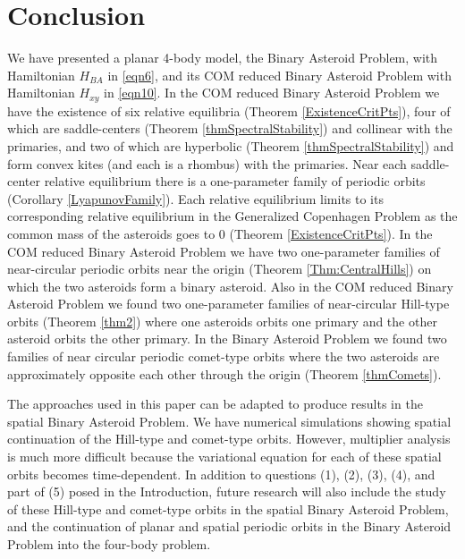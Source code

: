 \documentclass[12pt]{article}
\begin{document}

\section{Conclusion}\label{sec13}
We have presented a planar 4-body model, the Binary Asteroid Problem, with Hamiltonian $H_{BA}$ in \eqref{eqn6}, and its COM reduced Binary Asteroid Problem with Hamiltonian $H_{xy}$ in \eqref{eqn10}. In the COM reduced Binary Asteroid Problem we have the existence of six relative equilibria (Theorem \ref{ExistenceCritPts}), four of which are saddle-centers (Theorem \ref{thmSpectralStability}) and collinear with the primaries, and two of which are hyperbolic (Theorem \ref{thmSpectralStability}) and form convex kites (and each is a rhombus) with the primaries. Near each saddle-center relative equilibrium there is a one-parameter family of periodic orbits (Corollary \ref{LyapunovFamily}). Each relative equilibrium limits to its corresponding relative equilibrium in the Generalized Copenhagen Problem as the common mass of the asteroids goes to $0$ (Theorem \ref{ExistenceCritPts}). In the COM reduced Binary Asteroid Problem we have two one-parameter families of near-circular periodic orbits near the origin (Theorem \ref{Thm:CentralHills}) on which the two asteroids form a binary asteroid. Also in the COM reduced Binary Asteroid Problem we found two one-parameter families of near-circular Hill-type orbits (Theorem \ref{thm2}) where one asteroids orbits one primary and the other asteroid orbits the other primary. In the Binary Asteroid Problem we found two families of near circular periodic comet-type orbits where the two asteroids are approximately opposite each other through the origin (Theorem \ref{thmComets}).

The approaches used in this paper can be adapted to produce results in the spatial Binary Asteroid Problem. We have numerical simulations showing spatial continuation of the Hill-type and comet-type orbits. However, multiplier analysis is much more difficult because the variational equation for each of these spatial orbits becomes time-dependent. In addition to questions (1), (2), (3), (4), and part of (5) posed in the Introduction, future research will also include the study of these Hill-type and comet-type orbits in the spatial Binary Asteroid Problem, and the continuation of planar and spatial periodic orbits in the Binary Asteroid Problem into the four-body problem.











\end{document}
